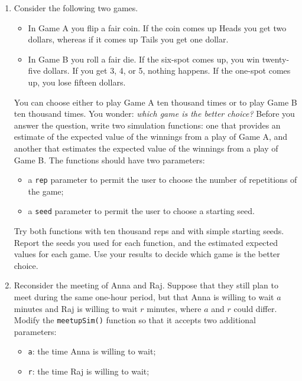 \documentclass[]{book}
\providecommand{\tightlist}{%
  \setlength{\itemsep}{0pt}\setlength{\parskip}{0pt}}
\theoremstyle{definition}
\theoremstyle{definition}
\theoremstyle{definition}
\theoremstyle{remark}
\begin{document}
{\begin{enumerate}
\def\labelenumi{\arabic{enumi}.}
\item
  Consider the following two games.

  \begin{itemize}
  \tightlist
  \item
    In Game A you flip a fair coin. If the coin comes up Heads you get
    two dollars, whereas if it comes up Tails you get one dollar.
  \item
    In Game B you roll a fair die. If the six-spot comes up, you win
    twenty-five dollars. If you get 3, 4, or 5, nothing happens. If the
    one-spot comes up, you lose fifteen dollars.
  \end{itemize}

  You can choose either to play Game A ten thousand times or to play
  Game B ten thousand times. You wonder: \emph{which game is the better
  choice?} Before you answer the question, write two simulation
  functions: one that provides an estimate of the expected value of the
  winnings from a play of Game A, and another that estimates the
  expected value of the winnings from a play of Game B. The functions
  should have two parameters:

  \begin{itemize}
  \tightlist
  \item
    a \texttt{rep} parameter to permit the user to choose the number of
    repetitions of the game;
  \item
    a \texttt{seed} parameter to permit the user to choose a starting
    seed.
  \end{itemize}

  Try both functions with ten thousand reps and with simple starting
  seeds. Report the seeds you used for each function, and the estimated
  expected values for each game. Use your results to decide which game
  is the better choice.
\item
  Reconsider the meeting of Anna and Raj. Suppose that they still plan
  to meet during the same one-hour period, but that Anna is willing to
  wait \(a\) minutes and Raj is willing to wait \(r\) minutes, where
  \(a\) and \(r\) could differ. Modify the \texttt{meetupSim()} function
  so that it accepts two additional parameters:

  \begin{itemize}
  \tightlist
  \item
    \texttt{a}: the time Anna is willing to wait;
  \item
    \texttt{r}: the time Raj is willing to wait;
  \end{itemize}


\end{enumerate}}
\end{document}
